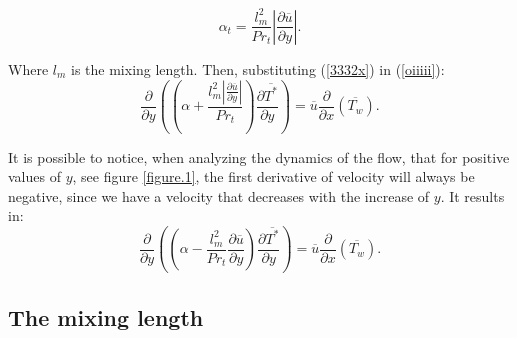 \documentclass[10pt]{article} %
\begin{document}
\begin{equation}\label{3332x}
\alpha_t = \frac{{l^2_m}}{Pr_t} \left| \frac{\partial \overline{u}}{\partial y} \right|.
\end{equation}

Where $l_m$ is the mixing length. Then, substituting (\ref{3332x}) in (\ref{oiiiii}):
\\
\begin{equation}\label{equationquasela}
{\frac{\partial{}}{\partial{y}}} \left( \left( \alpha   
+ \frac{{l^2_m} \left| \frac{\partial \overline{u}}{\partial y} \right|}{Pr_t} \right) \frac{\partial \overline{T^\ast}}{\partial y} \right)
= 
\overline{u}\frac{\partial{}}{\partial{x}}\left(\overline{T_w}\right)  .
\end{equation}


It is possible to notice, when analyzing the dynamics of the flow, that for positive values of $ y $, see figure \ref{figure.1}, the first derivative of velocity will always be negative, since we have a velocity that decreases with the increase of $ y $. It results in:\\
\begin{equation}
{\frac{\partial{}}{\partial{y}}} \left( \left( \alpha   
- \frac{{l^2_m}}{Pr_t}\frac{\partial \overline{u}}{\partial y} \right) \frac{\partial \overline{T^\ast}}{\partial y} \right)
= 
\overline{u}\frac{\partial{}}{\partial{x}}\left(\overline{T_w}\right)  .
\end{equation}


\subsection{The mixing length}
\end{document}
